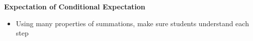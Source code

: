 \item \textbf{Expectation of Conditional Expectation}
\begin{itemize}
\item Using many properties of summations, make sure students understand each step
\end{itemize}
